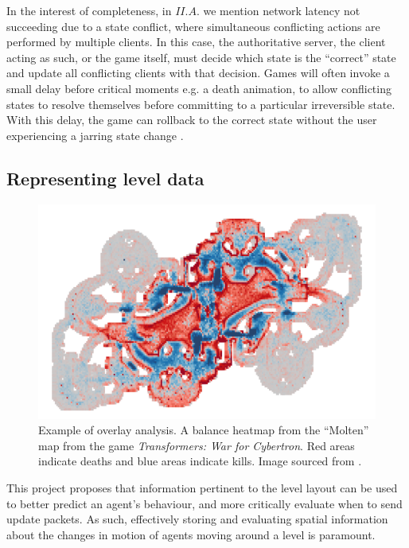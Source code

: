 \documentclass[journal]{IEEEtran}
\begin{document}
In the interest of completeness, in $II.A.$ we mention network latency not succeeding due to a state conflict, where simultaneous conflicting actions are performed by multiple clients. In this case, the authoritative server, the client acting as such, or the game itself, must decide which state is the ``correct'' state and update all conflicting clients with that decision. Games will often invoke a small delay before critical moments e.g. a death animation, to allow conflicting states to resolve themselves before committing to a particular irreversible state. With this delay, the game can rollback to the correct state without the user experiencing a jarring state change \cite{mauve2000keep}.

\subsection{Representing level data}

\begin{figure}[h]
    \centering
    \includegraphics[width=0.8\linewidth]{Heatmap1.png}
    \caption{Example of overlay analysis. A balance heatmap from the ``Molten'' map from the game \textit{Transformers: War for Cybertron}. Red areas indicate deaths and blue areas indicate kills. Image sourced from \cite{drachen2013spatial}.}
    \label{fig:hm1}
\end{figure}

This project proposes that information pertinent to the level layout can be used to better predict an agent's behaviour, and more critically evaluate when to send update packets. As such, effectively storing and evaluating spatial information about the changes in motion of agents moving around a level is paramount. 
\end{document}
